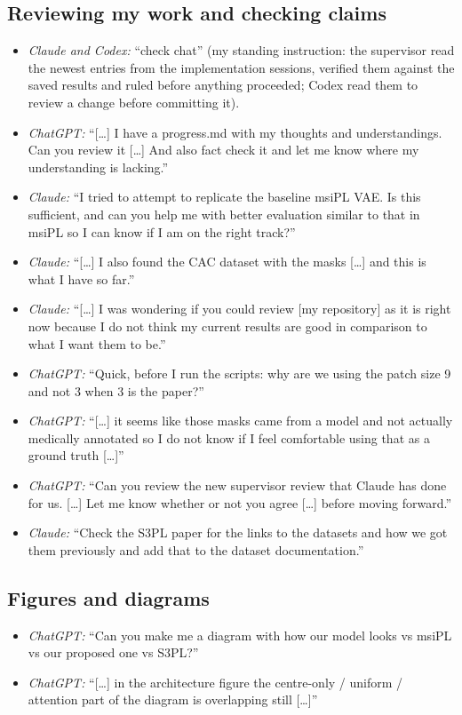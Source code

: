 \subsection*{Reviewing my work and checking claims}
\begin{itemize}
  \item \emph{Claude and Codex:} ``check chat'' (my standing instruction: the
        supervisor read the newest entries from the implementation sessions,
        verified them against the saved results and ruled before anything
        proceeded; Codex read them to review a change before committing it).
  \item \emph{ChatGPT:} ``[\ldots] I have a progress.md with my thoughts and
        understandings. Can you review it [\ldots] And also fact check it and let
        me know where my understanding is lacking.''
  \item \emph{Claude:} ``I tried to attempt to replicate the baseline msiPL VAE.
        Is this sufficient, and can you help me with better evaluation similar to
        that in msiPL so I can know if I am on the right track?''
  \item \emph{Claude:} ``[\ldots] I also found the CAC dataset with the masks
        [\ldots] and this is what I have so far.''
  \item \emph{Claude:} ``[\ldots] I was wondering if you could review [my
        repository] as it is right now because I do not think my current results
        are good in comparison to what I want them to be.''
  \item \emph{ChatGPT:} ``Quick, before I run the scripts: why are we using the
        patch size 9 and not 3 when 3 is the paper?''
  \item \emph{ChatGPT:} ``[\ldots] it seems like those masks came from a
        model and not actually medically annotated so I do not know if I feel
        comfortable using that as a ground truth [\ldots]''
  \item \emph{ChatGPT:} ``Can you review the new supervisor review that
        Claude has done for us. [\ldots] Let me know whether or not you agree
        [\ldots] before moving forward.''
  \item \emph{Claude:} ``Check the S3PL paper for the links to the
        datasets and how we got them previously and add that to the dataset
        documentation.''
\end{itemize}

\subsection*{Figures and diagrams}
\begin{itemize}
  \item \emph{ChatGPT:} ``Can you make me a diagram with how our model looks vs
        msiPL vs our proposed one vs S3PL?''
  \item \emph{ChatGPT:} ``[\ldots] in the architecture figure the centre-only /
        uniform / attention part of the diagram is overlapping still [\ldots]''
\end{itemize}

